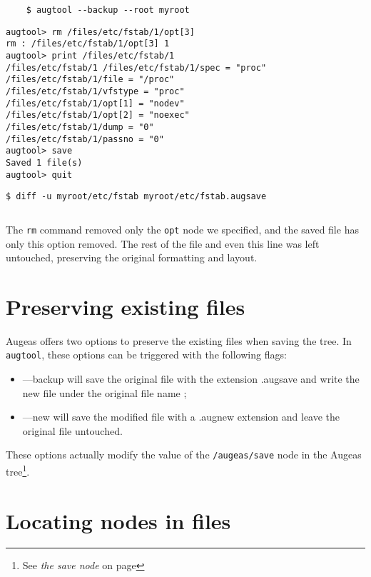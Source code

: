 \begin{verbatim}
    $ augtool --backup --root myroot
\end{verbatim}
\begin{verbatim}
augtool> rm /files/etc/fstab/1/opt[3]
rm : /files/etc/fstab/1/opt[3] 1
augtool> print /files/etc/fstab/1
/files/etc/fstab/1 /files/etc/fstab/1/spec = "proc"
/files/etc/fstab/1/file = "/proc"
/files/etc/fstab/1/vfstype = "proc"
/files/etc/fstab/1/opt[1] = "nodev"
/files/etc/fstab/1/opt[2] = "noexec"
/files/etc/fstab/1/dump = "0"
/files/etc/fstab/1/passno = "0"
augtool> save
Saved 1 file(s)
augtool> quit
\end{verbatim}
\begin{verbatim}
$ diff -u myroot/etc/fstab myroot/etc/fstab.augsave
\end{verbatim}
\inputminted[linenos,frame=leftline]{diff}{listings/fstab_opt.diff}


The \verb!rm! command removed only the \verb!opt! node we specified, and the saved file has only this option removed. The rest of the file and even this line was left untouched, preserving the original formatting and layout.

\section{Preserving existing files}

  

Augeas offers two options to preserve the existing files when saving the tree. In \verb!augtool!, these options can be triggered with the following flags:

\begin{itemize}
\item
  ---backup will save the original file with the extension .augsave and write the new file under the original file name ;
\item
  ---new will save the modified file with a .augnew extension and leave the original file untouched.
\end{itemize}
These options actually modify the value of the \verb!/augeas/save! node in the Augeas tree\footnote{See \emph{the save node} on page \pageref{sec:save_node}}.

\section{Locating nodes in files}

